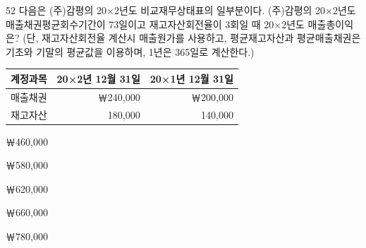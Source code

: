 \begin{question}{52}
다음은 (주)감평의 20×2년도 비교재무상태표의 일부분이다. (주)감평의 20×2년도 매출채권평균회수기간이 73일이고 재고자산회전율이 3회일 때 20×2년도 매출총이익은? (단, 재고자산회전율 계산시 매출원가를 사용하고, 평균재고자산과 평균매출채권은 기초와 기말의 평균값을 이용하며, 1년은 365일로 계산한다.)

{\small\centering
\begin{tabular}{|c|r|r|}\hline
계정과목 & \multicolumn{1}{c|}{20×2년 12월 31일} & \multicolumn{1}{c|}{20×1년 12월 31일} \\ \hline
매출채권 & ￦240,000 & ￦200,000 \\ \hline
재고자산 & 180,000 & 140,000 \\ \hline
\end{tabular}\par}
\begin{choices}
  \item ￦460,000
  \item ￦580,000
  \item ￦620,000
  \item ￦660,000
  \item ￦780,000
\end{choices}
\end{question}
